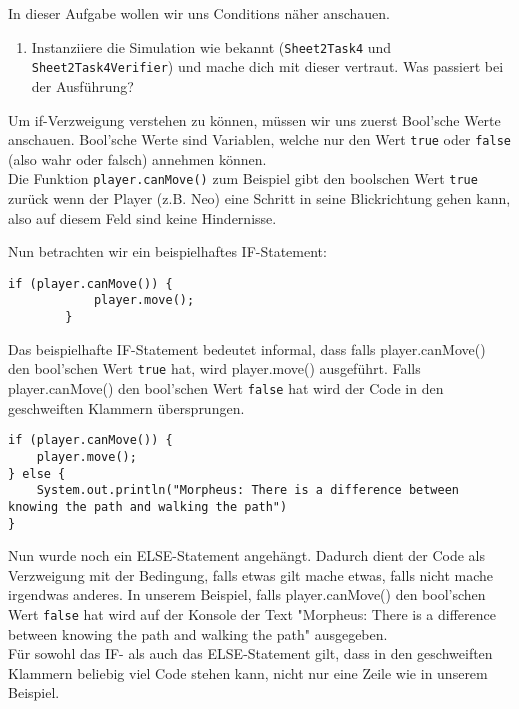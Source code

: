 

In dieser Aufgabe wollen wir uns Conditions näher anschauen.

\begin{enumerate}                           
    \item Instanziiere die Simulation wie bekannt (\lstinline{Sheet2Task4} und \lstinline{Sheet2Task4Verifier}) und mache dich mit dieser vertraut.
        Was passiert bei der Ausführung?
\end{enumerate}

\begin{Infobox}
    Um if-Verzweigung verstehen zu können, müssen wir uns zuerst Bool'sche Werte anschauen. Bool'sche Werte sind Variablen, welche nur den Wert \lstinline{true} oder \lstinline{false} (also wahr oder falsch) annehmen können. \\

    Die Funktion \lstinline{player.canMove()} zum Beispiel gibt den boolschen Wert \lstinline{true} zurück wenn der Player (z.B. Neo) eine Schritt in seine Blickrichtung gehen kann, also auf diesem Feld sind keine Hindernisse. 
    
\end{Infobox}

\begin{Infobox}[IF-Verzweigung]
    Nun betrachten wir ein beispielhaftes IF-Statement:

    \begin{lstlisting}[breaklines=true, numbers=none]
        if (player.canMove()) {
            player.move();
        } 
    \end{lstlisting}

    Das beispielhafte IF-Statement bedeutet informal, dass falls player.canMove() den bool'schen Wert \lstinline{true} hat, wird player.move() ausgeführt. Falls player.canMove() den bool'schen Wert \lstinline{false} hat wird der Code in den geschweiften Klammern übersprungen.

    \begin{lstlisting}[breaklines=true, numbers=none]
if (player.canMove()) {
    player.move();
} else {
    System.out.println("Morpheus: There is a difference between knowing the path and walking the path")
}
    \end{lstlisting}

    Nun wurde noch ein ELSE-Statement angehängt. Dadurch dient der Code als Verzweigung mit der Bedingung, falls etwas gilt mache etwas, falls nicht mache irgendwas anderes. In unserem Beispiel, falls player.canMove() den bool'schen Wert \lstinline{false} hat wird auf der Konsole der Text "Morpheus: There is a difference between knowing the path and walking the path" ausgegeben.\\

    Für sowohl das IF- als auch das ELSE-Statement gilt, dass in den geschweiften Klammern beliebig viel Code stehen kann, nicht nur eine Zeile wie in unserem Beispiel.
\end{Infobox}


